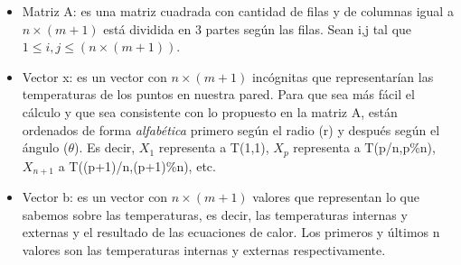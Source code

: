 \begin{itemize}
  \item Matriz A: es una matriz cuadrada con cantidad de filas y de columnas igual a $n \times (m+1)$ 
  	está dividida en 3 partes según las filas.  Sean i,j tal que $1 \leq i,j \leq (n \times
	(m+1))$. \\
 \item Vector x: es un vector con $n \times (m+1)$ incógnitas que representarían las temperaturas de los
 puntos en nuestra pared. Para que sea más fácil el cálculo y que sea consistente con lo propuesto
 en la matriz A, están ordenados de forma \textit{alfabética} primero según el radio (r) y después según
 el ángulo ($\theta$). Es decir, $X_1$ representa a T(1,1), $X_p$ representa a T(p/n,p\%n), $X_{n+1}$ a
 T((p+1)/n,(p+1)\%n), etc.
 \item Vector b: es un vector con $n \times (m+1)$ valores que representan lo que sabemos sobre las
 temperaturas, es decir, las temperaturas internas y externas y el resultado de las ecuaciones de calor.
 Los primeros y últimos n valores son las temperaturas internas y externas respectivamente.
\end{itemize}

